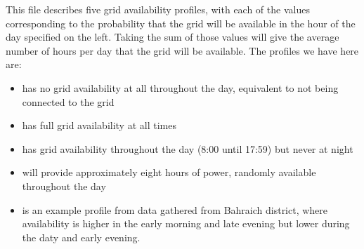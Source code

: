 \documentclass[letterpaper,10pt,english]{sphinxmanual}
\begin{document}
\begin{sphinxVerbatim}[commandchars=\\\{\}]
                                    
                                    
                                    
                                    
                                    
                                    
                                    
                                    
                                    
                                    
\end{sphinxVerbatim}

\sphinxAtStartPar
This file describes five grid availability profiles, with each of the
values corresponding to the probability that the grid will be available
in the hour of the day specified on the left. Taking the sum of those
values will give the average number of hours per day that the grid will
be available. The profiles we have here are:
\begin{itemize}
\item {} 
\sphinxAtStartPar
{} has no grid availability at all throughout the day, equivalent to not being connected to the grid

\item {} 
\sphinxAtStartPar
{} has full grid availability at all times

\item {} 
\sphinxAtStartPar
{} has grid availability throughout the day (8:00 until 17:59) but never at night

\item {} 
\sphinxAtStartPar
{} will provide approximately eight hours of power, randomly available throughout the day

\item {} 
\sphinxAtStartPar
{} is an example profile from data gathered from Bahraich district, where availability is higher in the early morning and late evening but lower during the daty and early evening.

\end{itemize}
\end{document}
